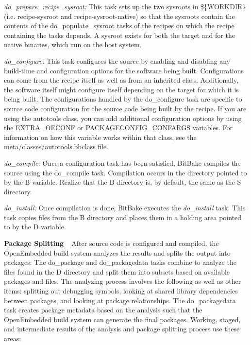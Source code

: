 \begin{DoxyItemize}
\begin{DoxyItemize}
\item {\itshape do\+\_\+prepare\+\_\+recipe\+\_\+sysroot\+:} This task sets up the two sysroots in \$\{W\+O\+R\+K\+D\+IR\} (i.\+e. recipe-\/sysroot and recipe-\/sysroot-\/native) so that the sysroots contain the contents of the do\+\_\+populate\+\_\+sysroot tasks of the recipes on which the recipe containing the tasks depends. A sysroot exists for both the target and for the native binaries, which run on the host system.
\item {\itshape do\+\_\+configure\+:} This task configures the source by enabling and disabling any build-\/time and configuration options for the software being built. Configurations can come from the recipe itself as well as from an inherited class. Additionally, the software itself might configure itself depending on the target for which it is being built. The configurations handled by the do\+\_\+configure task are specific to source code configuration for the source code being built by the recipe. If you are using the autotools class, you can add additional configuration options by using the E\+X\+T\+R\+A\+\_\+\+O\+E\+C\+O\+NF or P\+A\+C\+K\+A\+G\+E\+C\+O\+N\+F\+I\+G\+\_\+\+C\+O\+N\+F\+A\+R\+GS variables. For information on how this variable works within that class, see the meta/classes/autotools.\+bbclass file.
\item {\itshape do\+\_\+compile\+:} Once a configuration task has been satisfied, Bit\+Bake compiles the source using the do\+\_\+compile task. Compilation occurs in the directory pointed to by the B variable. Realize that the B directory is, by default, the same as the S directory.
\item {\itshape do\+\_\+install\+:} Once compilation is done, Bit\+Bake executes the {\itshape do\+\_\+install} task. This task copies files from the B directory and places them in a holding area pointed to by the D variable.
\end{DoxyItemize}
\item {\bfseries Package Splitting} ~\newline
 After source code is configured and compiled, the Open\+Embedded build system analyzes the results and splits the output into packages\+:  The do\+\_\+package and do\+\_\+packagedata tasks combine to analyze the files found in the D directory and split them into subsets based on available packages and files. The analyzing process involves the following as well as other items\+: splitting out debugging symbols, looking at shared library dependencies between packages, and looking at package relationships. The do\+\_\+packagedata task creates package metadata based on the analysis such that the Open\+Embedded build system can generate the final packages. Working, staged, and intermediate results of the analysis and package splitting process use these areas\+:

\end{DoxyItemize}
